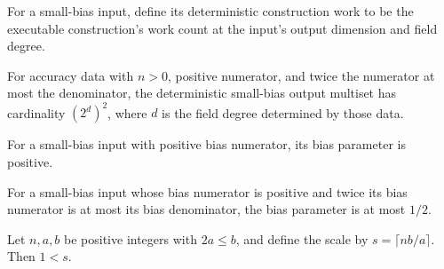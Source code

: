 \begin{definition}
\label{FABL.deterministicSmallBiasWork}
\leanok
{}
For a small-bias input, define its deterministic construction work to be the executable
construction's work count at the input's output dimension and field degree.
\end{definition}

\begin{theorem}
\label{FABL.deterministicSmallBiasMultiset_card}
\leanok
{}
For accuracy data with $n>0$, positive numerator, and twice the numerator at most the
denominator, the deterministic small-bias output multiset has cardinality $(2^d)^2$,
where $d$ is the field degree determined by those data.
\end{theorem}

\begin{theorem}
\label{FABL.SmallBiasInput.epsilon_pos}
\leanok
{}
For a small-bias input with positive bias numerator, its bias parameter is positive.
\end{theorem}

\begin{theorem}
\label{FABL.SmallBiasInput.epsilon_le_half}
\leanok
{}
For a small-bias input whose bias numerator is positive and twice its bias numerator is
at most its bias denominator, the bias parameter is at most $1/2$.
\end{theorem}

\begin{theorem}
\label{FABL.SmallBiasInput.one_lt_scale}
\leanok
{}
Let $n,a,b$ be positive integers with $2a\le b$, and define the scale by $s=\lceil
nb/a\rceil$. Then $1<s$.
\end{theorem}

